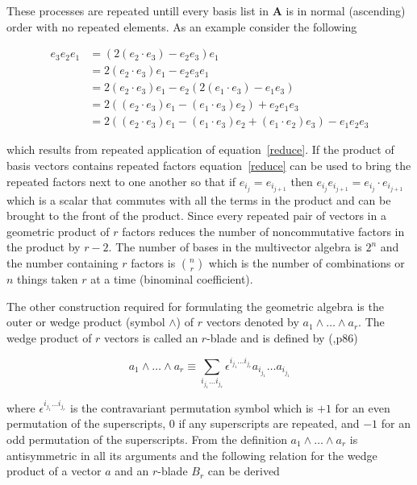 \documentclass[10pt]{article}
\newcommand{\W}{\wedge}
\begin{document}
These processes are repeated untill every basis list in $\bm{A}$ is in normal
(ascending) order with no repeated elements. As an example consider the
following

   \begin{align}
      e_{3}e_{2}e_{1} &= (2(e_{2}\cdot e_{3}) - e_{2}e_{3})e_{1} \\
                      &= 2(e_{2}\cdot e_{3})e_{1} - e_{2}e_{3}e_{1} \\
                      &= 2(e_{2}\cdot e_{3})e_{1} - e_{2}(2(e_{1}\cdot e_{3})-e_{1}e_{3}) \\
                      &= 2((e_{2}\cdot e_{3})e_{1}-(e_{1}\cdot e_{3})e_{2})+e_{2}e_{1}e_{3} \\
                      &= 2((e_{2}\cdot e_{3})e_{1}-(e_{1}\cdot e_{3})e_{2}+(e_{1}\cdot e_{2})e_{3})-e_{1}e_{2}e_{3}
   \end{align}

which results from repeated application of equation~\ref{reduce}.  If the product of basis vectors contains repeated factors
equation~\ref{reduce} can be used to bring the repeated factors next to one another so that if $e_{i_{j}} = e_{i_{j+1}}$
then $e_{i_{j}}e_{i_{j+1}} = e_{i_{j}}\cdot e_{i_{j+1}}$ which is a scalar that commutes with all the terms in the product
and can be brought to the front of the product.  Since every repeated pair of vectors in a geometric product of $r$ factors
reduces the number of noncommutative factors in the product by $r-2$. The number of bases in the multivector algebra is $2^{n}$
and the number containing $r$ factors is ${n\choose r}$ which is the number of combinations or $n$ things
taken $r$ at a time (binominal coefficient).

The other construction required for formulating the geometric algebra is the outer or wedge product (symbol $\W$) of $r$
vectors denoted by $a_{1}\W\dots\W a_{r}$.  The wedge product of $r$ vectors is called an $r$-blade and is defined
by (\cite{Doran},p86)

   \begin{equation}
      a_{1}\W\dots\W a_{r} \equiv \sum_{i_{j_{1}}\dots i_{j_{r}}} \epsilon^{i_{j_{1}}\dots i_{j_{r}}}a_{i_{j_{1}}}\dots a_{i_{j_{1}}}
   \end{equation}

where $\epsilon^{i_{j_{1}}\dots i_{j_{r}}}$ is the contravariant permutation symbol which is $+1$ for an even permutation of the
superscripts, $0$ if any superscripts are repeated, and $-1$ for an odd permutation of the superscripts. From the definition
$a_{1}\W\dots\W a_{r}$ is antisymmetric in all its arguments and the following relation for the wedge product of a vector $a$ and an
$r$-blade $B_{r}$ can be derived
\end{document}
